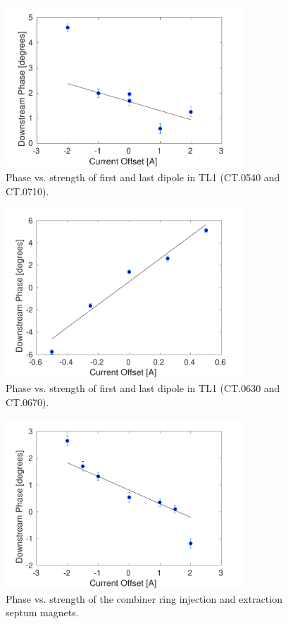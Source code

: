 \begin{figure}
  \centering
  \includegraphics[width=0.8\textwidth]{Figures/propagation/tl1540}
  \caption{Phase vs. strength of first and last dipole in TL1 (CT.0540 and CT.0710).}
  \label{f:tl1540}
\end{figure}

\begin{figure}
  \centering
  \includegraphics[width=0.8\textwidth]{Figures/propagation/tl1670}
  \caption{Phase vs. strength of first and last dipole in TL1 (CT.0630 and CT.0670).}
  \label{f:tl1670}
\end{figure}

\begin{figure}
  \centering
  \includegraphics[width=0.8\textwidth]{Figures/propagation/crSeptum}
  \caption{Phase vs. strength of the combiner ring injection and extraction septum magnets.}
  \label{f:crSeptum}
\end{figure}

